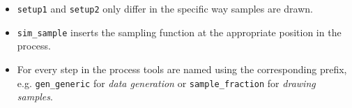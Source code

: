 \begin{Shaded}
\end{Shaded}

\begin{itemize}
\itemsep1pt\parskip0pt
\item
  \texttt{setup1} and \texttt{setup2} only differ in the specific way
  samples are drawn.
\item
  \texttt{sim\_sample} inserts the sampling function at the appropriate
  position in the process.
\item
  For every step in the process tools are named using the corresponding
  prefix, e.g. \texttt{gen\_generic} for \textit{data generation} or
  \texttt{sample\_fraction} for \textit{drawing samples}.
\end{itemize}
